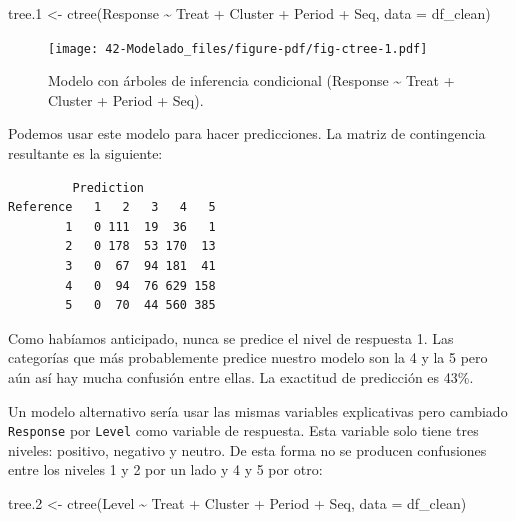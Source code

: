 \documentclass[
  12pt,
  a4paper,
  extrafontsizes,
  onecolumn,
  openright]{memoir}
\newenvironment{Shaded}{\begin{snugshade}}{\end{snugshade}}
\newcommand{\AttributeTok}[1]{\textcolor[rgb]{0.40,0.45,0.13}{#1}}
\newcommand{\FloatTok}[1]{\textcolor[rgb]{0.68,0.00,0.00}{#1}}
\newcommand{\FunctionTok}[1]{\textcolor[rgb]{0.28,0.35,0.67}{#1}}
\newcommand{\NormalTok}[1]{\textcolor[rgb]{0.00,0.23,0.31}{#1}}
\newcommand{\OtherTok}[1]{\textcolor[rgb]{0.00,0.23,0.31}{#1}}
\newcommand{\SpecialCharTok}[1]{\textcolor[rgb]{0.37,0.37,0.37}{#1}}
\begin{document}
\scriptsize

\begin{Shaded}
\begin{Highlighting}[]
\NormalTok{tree}\FloatTok{.1} \OtherTok{\textless{}{-}} \FunctionTok{ctree}\NormalTok{(Response }\SpecialCharTok{\textasciitilde{}}\NormalTok{ Treat }\SpecialCharTok{+}\NormalTok{ Cluster }\SpecialCharTok{+}\NormalTok{ Period }\SpecialCharTok{+}\NormalTok{ Seq, }\AttributeTok{data =}\NormalTok{ df\_clean)}
\end{Highlighting}
\end{Shaded}

\normalsize

\begin{figure}[h]

{\centering \texttt{[image: 42-Modelado\_files/figure-pdf/fig-ctree-1.pdf]}

}

\caption{\label{fig-ctree}Modelo con árboles de inferencia condicional
(Response \textasciitilde{} Treat + Cluster + Period + Seq).}

\end{figure}

Podemos usar este modelo para hacer predicciones. La matriz de
contingencia resultante es la siguiente:

\scriptsize

\begin{verbatim}
         Prediction
Reference   1   2   3   4   5
        1   0 111  19  36   1
        2   0 178  53 170  13
        3   0  67  94 181  41
        4   0  94  76 629 158
        5   0  70  44 560 385
\end{verbatim}

\normalsize

Como habíamos anticipado, nunca se predice el nivel de respuesta 1. Las
categorías que más probablemente predice nuestro modelo son la 4 y la 5
pero aún así hay mucha confusión entre ellas. La exactitud de predicción
es 43\%.

Un modelo alternativo sería usar las mismas variables explicativas pero
cambiado \texttt{Response} por \texttt{Level} como variable de
respuesta. Esta variable solo tiene tres niveles: positivo, negativo y
neutro. De esta forma no se producen confusiones entre los niveles 1 y 2
por un lado y 4 y 5 por otro:

\scriptsize

\begin{Shaded}
\begin{Highlighting}[]
\NormalTok{tree}\FloatTok{.2} \OtherTok{\textless{}{-}} \FunctionTok{ctree}\NormalTok{(Level }\SpecialCharTok{\textasciitilde{}}\NormalTok{ Treat }\SpecialCharTok{+}\NormalTok{ Cluster }\SpecialCharTok{+}\NormalTok{ Period }\SpecialCharTok{+}\NormalTok{ Seq, }\AttributeTok{data =}\NormalTok{ df\_clean)}
\end{Highlighting}
\end{Shaded}
\end{document}
